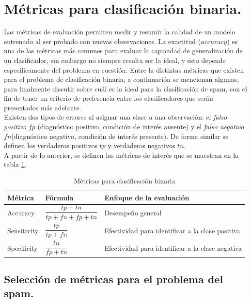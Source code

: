 \documentclass[12pt, letterpaper]{article}
\begin{document}
\section{Métricas para clasificación binaria.}

Las métricas de evaluación permiten medir y resumir la calidad de un modelo entrenado al ser probado con nuevas observaciones. La exactitud ($accuracy$) es una de las métricas más comunes para evaluar la capacidad de generalización de un clasificador, sin embargo no siempre resulta ser la ideal, y esto depende específicamente del problema en cuestión. Entre la distintas métricas que existen para el problema de clasificación binaria, a continuación se mencionan algunas, para finalmente discutir sobre cuál es la ideal para la clasificación de spam, con el fin de tener un criterio de preferencia entre los clasificadores que serán presentados más adelante. \\

Existen dos tipos de errores al asignar una clase a una observación: el \textit{falso positivo} $fp$ (diagnóstico positivo, condición de interés ausente) y el \textit{falso negativo} $fn$(diagnóstico negativo, condición de interés presente). De forma similar se definen los verdaderos positivos $tp$ y verdaderos negativos $tn$. \\

A partir de lo anterior, se definen las métricas de interés que se muestran en la tabla \ref{t_metricas}.

\begin{table}[ht]
\centering
\begin{tabular}{|l|l|l|}
\hline
\textbf{Métrica} & \textbf{Fórmula}             & \textbf{Enfoque de la evaluación}                \\ \hline
Accuracy         & $\dfrac{tp+tn}{tp+fn+fp+tn}$ & Desempeño general                                \\ \hline
Sensitivity      & $\dfrac{tp}{tp+fn}$          & Efectividad para identificar a la clase positiva \\ \hline
Specificity      & $\dfrac{tn}{fp+tn}$          & Efectividad para identificar a la clase negativa \\ \hline
\end{tabular}
\caption{Métricas para clasificación binaria}
\label{t_metricas}
\end{table}

\subsection{Selección de métricas para el problema del spam.}
\end{document}
